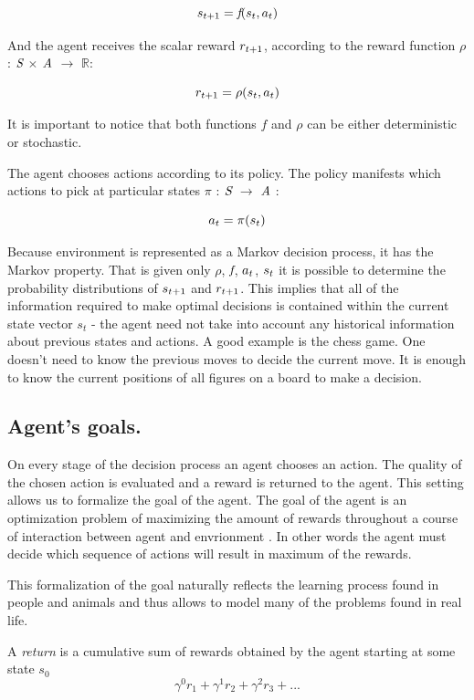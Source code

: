 $$\emph{$s_{t+1}$} = \emph{f}(\emph{$s_{t}$},\emph{$a_{t}$})$$

And the agent receives the scalar reward $\emph{$r_{t+1}$}$, according to the reward function $\rho$ : $\emph{S}$ $\times$ $\emph{A}$ $\rightarrow$ $\mathbb{R}$:

$$\emph{$r_{t+1}$} = \rho(\emph{$s_{t}$},\emph{$a_{t}$})$$

It is important to notice that both functions $f$ and $\rho$ can be either deterministic or stochastic.

The agent chooses actions according to its policy. The policy manifests which actions to pick at particular states $\pi$ : $\emph{S}$ $\rightarrow$ $\emph{A}$ :

$$\emph{$a_{t}$} = \pi(\emph{$s_{t}$})$$

Because environment is represented as a Markov decision process, it has the Markov property. That is given only $\rho$, $\emph{f}$, $\emph{$a_{t}$}$, $\emph{$s_{t}$}$ it is possible to determine the probability distributions of $\emph{$s_{t+1}$}$ and $\emph{$r_{t+1}$}$. This implies that all of the information required to make optimal decisions is contained within the current state vector $s_{t}$ - the agent need not take into account any historical information about previous states and actions. A good example is the chess game. One doesn't need to know the previous moves to decide the current move. It is enough to know the current positions of all figures on a board to make a decision.


\subsection{Agent's goals.}
On every stage of the decision process an agent chooses an action. The quality of the chosen action is evaluated and a reward is returned to the agent. This setting allows us to formalize the goal of the agent. The goal of the agent is an optimization problem of maximizing the amount of rewards throughout a course of interaction between agent and envrionment . In other words the agent must decide which sequence of actions will result in maximum of the rewards.

This formalization of the goal naturally reflects the learning process found in people and animals and thus allows to model many of the problems found in real life.

A \textit{return} is a cumulative sum of rewards obtained by the agent starting at some state $s_{0}$
$$\gamma^{0}\textit{r}_{1}+\gamma^{1}\textit{r}_{2}+\gamma^{2}\textit{r}_{3}+...$$

